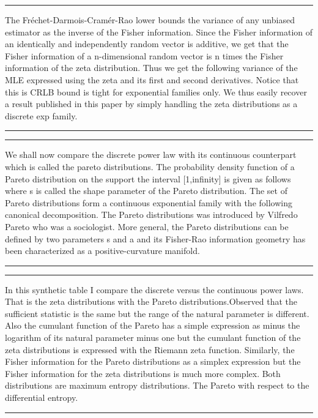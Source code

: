 \documentclass{article}
\def\slide#1{
\noindent\hrule
\begin{center}
\begin{minipage}{0.8\textwidth}
#1
\end{minipage}
\end{center}
\noindent\hrule
}
\begin{document}
\slide{The Fr\'echet-Darmois-Cram\'er-Rao lower bounds the variance of any unbiased estimator as the inverse of the Fisher information.
Since the Fisher information of an identically and independently random vector is additive, we get that the Fisher information of a n-dimensional random vector is n times the Fisher information of the zeta distribution.
Thus we get the following variance of the MLE expressed using the zeta and its first and second derivatives.
Notice that this is CRLB bound is tight for exponential families only.
We thus easily recover a result published in this paper by simply handling the zeta distributions as a discrete exp family.}








\slide{
We shall now compare the discrete power law with its continuous counterpart which is called the pareto distributions.   
The probability density function of a Pareto distribution on the support the interval [1,infinity] is given as follows where s is called the shape parameter of the Pareto distribution.
The set of Pareto distributions form a continuous exponential family with the following canonical decomposition.
The Pareto distributions was introduced by Vilfredo Pareto who was a sociologist. More general, the Pareto distributions can be defined by two parameters s and a and its Fisher-Rao information geometry has been characterized as a positive-curvature manifold.  
}
 





\slide{
In this synthetic table I compare the discrete versus the continuous power laws. That is the zeta distributions with the Pareto distributions.Observed that the sufficient statistic is the same but the range of the natural parameter is different.
Also the cumulant function of the Pareto has a simple expression as minus the logarithm of its natural parameter minus one but the cumulant function of the zeta distributions is expressed with the Riemann zeta function.
Similarly, the Fisher information for the Pareto distributions as a simplex expression but the Fisher information for the zeta distributions is much more complex. Both distributions are maximum entropy distributions. The Pareto with respect to the differential entropy.}
\end{document}
